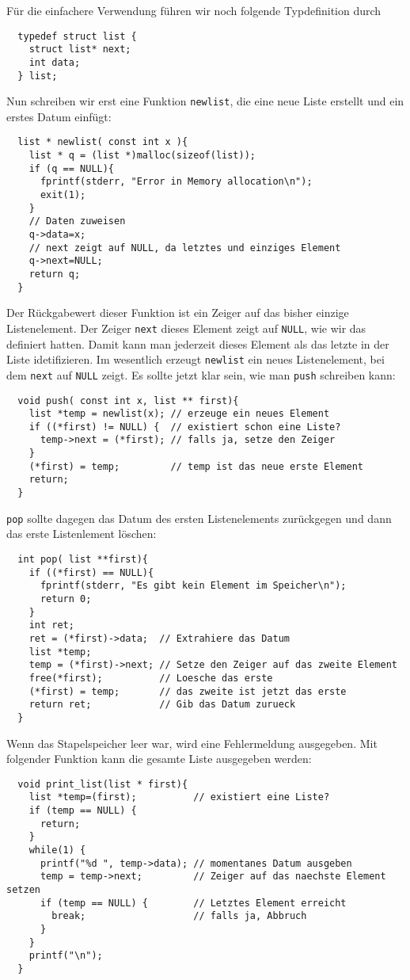 Für die einfachere Verwendung führen wir noch folgende Typdefinition durch
\begin{lstlisting}
  typedef struct list {
    struct list* next;
    int data;
  } list;
\end{lstlisting}
Nun schreiben wir erst eine Funktion \verb|newlist|, die eine neue Liste erstellt und ein erstes Datum einfügt:
\begin{lstlisting}
  list * newlist( const int x ){
    list * q = (list *)malloc(sizeof(list));
    if (q == NULL){
      fprintf(stderr, "Error in Memory allocation\n");
      exit(1);
    }
    // Daten zuweisen 
    q->data=x;
    // next zeigt auf NULL, da letztes und einziges Element
    q->next=NULL;
    return q;
  }
\end{lstlisting}
Der Rückgabewert dieser Funktion ist ein Zeiger auf das bisher einzige Listenelement.
Der Zeiger \verb|next| dieses Element zeigt auf \verb|NULL|, wie wir das definiert hatten.
Damit kann man jederzeit dieses Element als das letzte in der Liste idetifizieren.
Im wesentlich erzeugt \verb|newlist| ein neues Listenelement, bei dem \verb|next| auf \verb|NULL| zeigt.
Es sollte jetzt klar sein, wie man \verb|push| schreiben kann:
\begin{lstlisting}
  void push( const int x, list ** first){
    list *temp = newlist(x); // erzeuge ein neues Element
    if ((*first) != NULL) {  // existiert schon eine Liste?
      temp->next = (*first); // falls ja, setze den Zeiger
    }
    (*first) = temp;         // temp ist das neue erste Element
    return;
  }
\end{lstlisting}
\verb|pop| sollte dagegen das Datum des ersten Listenelements zurückgegen und dann das erste Listenlement löschen:
\begin{lstlisting}
  int pop( list **first){
    if ((*first) == NULL){
      fprintf(stderr, "Es gibt kein Element im Speicher\n");
      return 0;
    }
    int ret;
    ret = (*first)->data;  // Extrahiere das Datum
    list *temp;
    temp = (*first)->next; // Setze den Zeiger auf das zweite Element
    free(*first);          // Loesche das erste
    (*first) = temp;       // das zweite ist jetzt das erste
    return ret;            // Gib das Datum zurueck
  }
\end{lstlisting}
Wenn das Stapelspeicher leer war, wird eine Fehlermeldung ausgegeben.
Mit folgender Funktion kann die gesamte Liste ausgegeben werden:
\begin{lstlisting}
  void print_list(list * first){
    list *temp=(first);          // existiert eine Liste?
    if (temp == NULL) {          
      return;
    }
    while(1) {
      printf("%d ", temp->data); // momentanes Datum ausgeben
      temp = temp->next;         // Zeiger auf das naechste Element setzen
      if (temp == NULL) {        // Letztes Element erreicht
        break;                   // falls ja, Abbruch
      }
    }
    printf("\n");
  }
\end{lstlisting}
